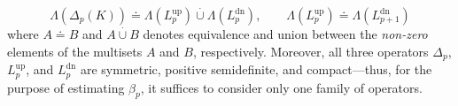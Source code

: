 \documentclass[10pt]{article}
\numberwithin{equation}{section}
\newcommand{\+}{%
	\raisebox{0.18ex}{\scaleobj{0.55}{+}}
}
\theoremstyle{definition}
\theoremstyle{definition}
\begin{document}
\begin{equation}\label{eq:lap_spectra_conn}
	\Lambda(\Delta_p(K)) \doteq \Lambda(L_p^{\text{up}}) \stackrel{\cdot}{\cup} \Lambda(L_p^{\text{dn}}), \quad \quad \Lambda(L_p^{\text{up}}) \doteq \Lambda(L_{p+1}^{\text{dn}})
\end{equation}
where $A \doteq B$ and $A \stackrel{\cdot}{\cup} B$ denotes equivalence and union between the \emph{non-zero} elements of the multisets $A$ and $B$, respectively.
Moreover, all three operators $\Delta_p$, $L_p^{\text{up}}$, and $L_p^{\text{dn}}$ are symmetric, positive semidefinite, and compact---thus, for the purpose of estimating $\beta_p$, it suffices to consider only one family of operators.


\end{document}
